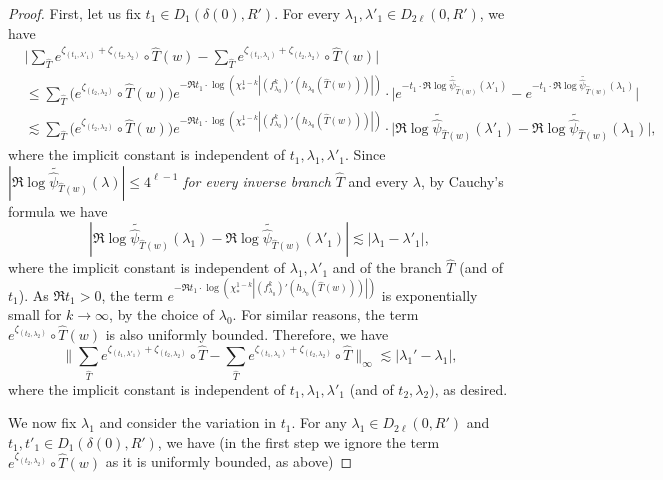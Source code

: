 \documentclass[11pt]{amsart}
\theoremstyle{plain}
\theoremstyle{definition}
\theoremstyle{remark}
\begin{document}
\begin{proof}
First, let us fix $t_1\in D_1 (\delta(0), R')$.
For every $\lambda_1, \lambda'_1\in D_{2\ell} (0,R')$, we have
\begin{align*}
&\Big| \sum_{\hat T} e^{\zeta_{(t_1,\lambda'_1)}+
\zeta_{(t_2,\lambda_2)}} \circ \hat{T} (w)-
\sum_{\hat T} e^{\zeta_{(t_1,\lambda_1)}+
\zeta_{(t_2,\lambda_2)}} \circ \hat{T} (w)\Big| \\
&\le \sum_{\hat T} 
\big(e^{\zeta_{(t_2,\lambda_2)}}\circ \hat T(w)\big)
e^{- \Re t_1 \cdot \log(\chi_*^{1-k}|(f^k_{\lambda_0})' (h_{\lambda_0}(\hat{T}(w)))|)} \cdot 
\Big|e^{-  t_1 \cdot \Re \widetilde{\log \hat \psi_{\hat{T}(w)}}(\lambda'_1)}  -e^{-  t_1 \cdot \Re \widetilde{\log \hat \psi_{\hat{T}(w)}}(\lambda_1)}  \Big|\\
& \lesssim
 \sum_{\hat T}
\big(e^{\zeta_{(t_2,\lambda_2)}}\circ \hat T(w)\big)
  e^{- \Re t_1 \cdot \log(\chi_*^{1-k}|(f^k_{\lambda_0})' (h_{\lambda_0}(\hat{T}(w)))|)}
\cdot 
\Big| \Re \widetilde{\log \hat \psi_{\hat{T}(w)}}(\lambda'_1)-  \Re \widetilde{\log \hat \psi_{\hat{T}(w)}}(\lambda_1)\Big|,
\end{align*}
where the implicit constant is independent of $t_1,\lambda_1, \lambda'_1$.
Since $|\Re \widetilde{\log \hat{\psi}_{\hat{T} (w)}}(\lambda)| \le 4^{\ell-1}$ 
\emph{for every inverse branch} $\hat T$
and every $\lambda$,
by Cauchy's formula
we have
$$|\Re \widetilde{\log \hat{\psi}_{\hat{T}
 (w)}}(\lambda_1) -\Re \widetilde{\log \hat{\psi}_{\hat{T}
 (w)}}(\lambda'_1)| \lesssim
|\lambda_1-\lambda'_1|,$$
where the implicit constant is independent of
$\lambda_1,\lambda'_1$ and of the branch $\hat T$ (and of $t_1$).
As $\Re t_1>0$, the term 
$e^{- \Re t_1 \cdot \log(\chi_*^{1-k}|(f^k_{\lambda_0})' (h_{\lambda_0}(\hat{T}(w)))|)} $ is 
exponentially small
for $k\to \infty$,
by the  choice of 
$\lambda_0$.
For similar reasons, the term 
$e^{\zeta_{(t_2,\lambda_2)}}\circ \hat T(w)$ is also uniformly bounded.
Therefore, we have
\begin{equation}\label{eq_3.123}
\Big\|\sum_{\hat T} e^{\zeta_{(t_1,\lambda'_1)}
+
\zeta_{(t_2,\lambda_2)}
} \circ \hat{T} - \sum_{\hat T} e^{\zeta_{(t_1,\lambda_1)}
+
\zeta_{(t_2,\lambda_2)}
} \circ \hat{T} \Big\|_\infty  \lesssim |\lambda_1'-\lambda_1|, 
\end{equation}
where the implicit constant is independent of $t_1,\lambda_1,\lambda'_1$
(and of $t_2, \lambda_2)$, as desired.

\medskip


We now fix $\lambda_1$ and consider the variation in $t_1$.
For any $\lambda_1 \in D_{2\ell}(0,R')$ and $t_1,t'_1 \in  D_1(\delta(0),R')$, 
we have
(in the first step we ignore the term
$e^{\zeta_{(t_2,\lambda_2)}}\circ \hat T(w)$ as it is uniformly bounded, as above)


\end{proof}
\end{document}
